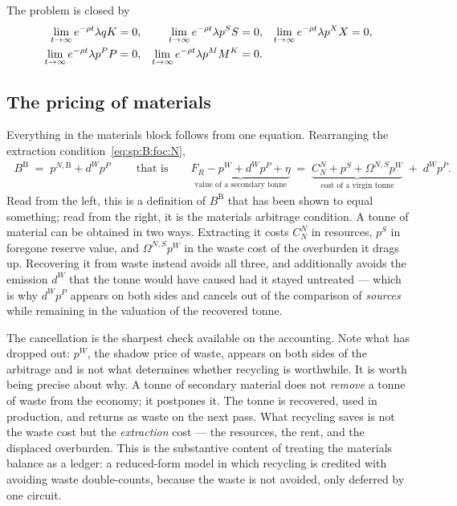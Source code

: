  The problem is closed by
\begin{align}
\lim_{t\to\infty}e^{-\rho t}\lambda q K &= 0,
&
\lim_{t\to\infty}e^{-\rho t}\lambda p^S S &= 0,
&
\lim_{t\to\infty}e^{-\rho t}\lambda p^X X &= 0,
\notag\\
\lim_{t\to\infty}e^{-\rho t}\lambda p^P P &= 0,
&
\lim_{t\to\infty}e^{-\rho t}\lambda p^M M^K &= 0 .
&&
\label{eq:sp:B:tvc}
\end{align}


\subsection{The pricing of materials}\label{sec:sp:B:materials}

Everything in the materials block follows from one equation. Rearranging the extraction
condition~\eqref{eq:sp:B:foc:N},
\begin{align}
\boxed{\;B^{\mathrm B}\;=\;p^{N,\mathrm B}+d^Wp^P\;}
\qquad\text{that is}\qquad
\underbrace{F_R-p^W+d^Wp^P+\eta}_{\text{value of a secondary tonne}}
\;=\;
\underbrace{C^N_N+p^S+\Omega^{N,S}p^W}_{\text{cost of a virgin tonne}}
\;+\;d^Wp^P .
\label{eq:sp:B:arbitrage}
\end{align}
Read from the left, this is a definition of $B^{\mathrm B}$ that has been shown to equal something; read from the
right, it is the materials arbitrage condition. A tonne of material can be obtained in two ways.
Extracting it costs $C^N_N$ in resources, $p^S$ in foregone reserve value, and $\Omega^{N,S}p^W$ in the
waste cost of the overburden it drags up. Recovering it from waste instead avoids all three, and
additionally avoids the emission $d^W$ that the tonne would have caused had it stayed untreated ---
which is why $d^Wp^P$ appears on both sides and cancels out of the comparison of \emph{sources} while
remaining in the valuation of the recovered tonne.

The cancellation is the sharpest check available on the accounting. Note what has dropped out: $p^W$,
the shadow price of waste, appears on both sides of the arbitrage and is not what determines whether
recycling is worthwhile. It is worth being precise about why. A tonne of secondary material does not
\emph{remove} a tonne of waste from the economy; it postpones it. The tonne is recovered, used in
production, and returns as waste on the next pass. What recycling saves is not the waste cost but the
\emph{extraction} cost --- the resources, the rent, and the displaced overburden. This is the
substantive content of treating the materials balance as a ledger: a reduced-form model in which
recycling is credited with avoiding waste double-counts, because the waste is not avoided, only
deferred by one circuit.

